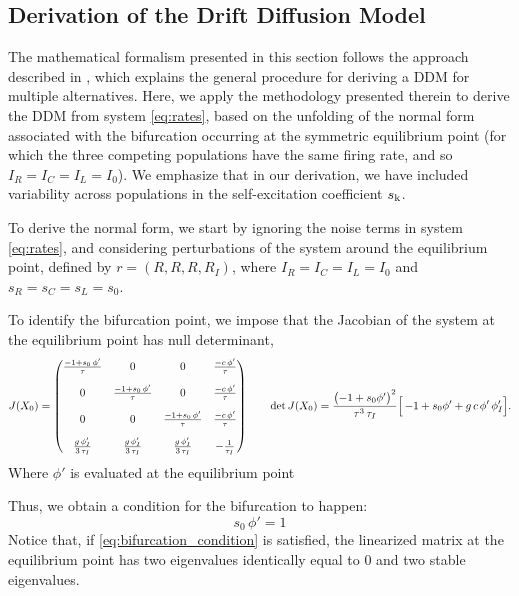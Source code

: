 \documentclass[../main.tex]{subfiles}
\begin{document}
\subsection{Derivation of the Drift Diffusion Model}
The mathematical formalism presented in this section follows the approach described in \cite{roxin2019}, which explains the general procedure for deriving a DDM for multiple alternatives. Here, we apply the methodology presented therein to derive the DDM from system \eqref{eq:rates}, based on the unfolding of the normal form associated with the bifurcation occurring at the symmetric equilibrium point (for which the three competing populations have the same firing rate, and so $I_R = I_C = I_L = I_0$). We emphasize that in our derivation, we have included variability across populations in the self-excitation coefficient $s_{\mathrm{k}}$.

To derive the normal form, we start by ignoring the noise terms in system \eqref{eq:rates}, and considering perturbations of the system around the equilibrium point, defined by $r = (R, R, R, R_I)$, where $I_R = I_C = I_L = I_0$ and $s_R = s_C = s_L = s_0$.

To identify the bifurcation point, we impose that the Jacobian of the system at the equilibrium point has null determinant, 
\smallskip
\[
J(X_0)=
\begin{pmatrix}
\frac{-1 + s_0\,\phi'}{\tau}& 0 & 0 & \frac{-c\,\phi'}{\tau}
\\[1em]
0 & \frac{-1 + s_0\,\phi'}{\tau}& 0 & \frac{-c\,\phi'}{\tau}
\\[1em]
0 & 0 & \frac{-1 + s_0\,\phi'}{\tau}& \frac{-c\,\phi'}{\tau}
\\[1em]
\frac{g\,\phi'_I}{3\,\tau_I}& \frac{g\,\phi'_I}{3\,\tau_I}& \frac{g\,\phi'_I}{3\,\tau_I}& -\frac{1}{\tau_I}
\end{pmatrix}
\qquad
\det J(X_0)
=\frac{\bigl(-1 + s_0\phi'\bigr)^2}{\tau^3\,\tau_I}
\Bigl[\,-1 + s_0\phi' + g\,c\,\phi'\,\phi'_I\Bigr].
\]
\bigskip
Where $\phi'$ is evaluated at the equilibrium point

Thus, we obtain a condition for the bifurcation to happen:
\begin{equation}
  s_0\,\phi' = 1
  \label{eq:bifurcation_condition}
\end{equation}
Notice that, if \eqref{eq:bifurcation_condition} is satisfied, the linearized matrix at the equilibrium point has two eigenvalues identically equal to 0 and two stable eigenvalues. 
\end{document}
